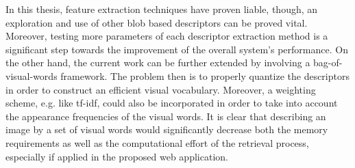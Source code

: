 In this thesis, feature extraction techniques have proven liable, though, an exploration and use of other blob based descriptors can be proved vital. Moreover, testing more parameters of each descriptor extraction method is a significant step towards the improvement of the overall system’s performance. On the other hand, the current work can be further extended by involving a bag-of-visual-words framework. The problem then is to properly quantize the descriptors in order to construct an efficient visual vocabulary. Moreover, a weighting scheme, e.g. like tf-idf, could also be incorporated in order to take into account the appearance frequencies of the visual words. It is clear that describing an image by a set of visual words would significantly decrease both the memory requirements as well as the computational effort of the retrieval process, especially if applied in the proposed web application.